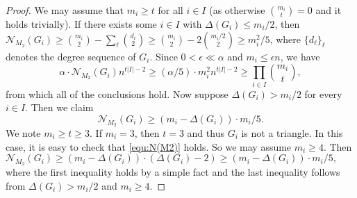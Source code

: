 \documentclass[10pt]{article}
\begin{document}
\begin{proof}
We may assume that $m_i\geq t$ for all $i\in I$ (as otherwise ${m_i \choose t}=0$ and it holds trivially).
If there exists some $i\in I$ with $\Delta(G_i)\leq m_i/2$, then $\mathcal{N}_{M_2}(G_i)\geq {m_i \choose 2}- \sum_\ell  {d_\ell\choose 2}\geq{m_i \choose 2}- 2{m_i/2 \choose 2}\geq m_i^2/5$, where $\{d_\ell\}_\ell$ denotes the degree sequence of $G_i$.
Since $0<\epsilon\ll \alpha$ and $m_i\leq \epsilon n$,  we  have
$$\alpha \cdot \mathcal{N}_{M_2}(G_i)n^{t|I|-2}\geq(\alpha/5)\cdot m_i^2 n^{t|I|-2}\geq  \prod_{i\in I}{m_i \choose t},$$
from which all of the conclusions hold.
Now suppose $\Delta(G_i)> m_i/2$ for every $i\in I$.
Then we claim
\begin{equation}\label{equ:N(M2)}
\mathcal{N}_{M_2}(G_i)\geq (m_i-\Delta(G_i))\cdot m_i/5.
\end{equation}
We note $m_i\geq t\geq 3$.
If $m_i=3$, then $t=3$ and thus $G_i$ is not a triangle. In this case, it is easy to check that \eqref{equ:N(M2)} holds.
So we may assume $m_i\geq 4$.
Then $\mathcal{N}_{M_2}(G_i)\geq (m_i-\Delta(G_i))\cdot (\Delta(G_i)-2)\geq (m_i-\Delta(G_i))\cdot m_i/5,$
where the first inequality holds by a simple fact and the last inequality follows from $\Delta(G_i)> m_i/2$ and $m_i\geq 4$.


\end{proof}
\end{document}
